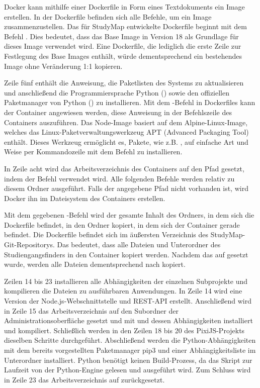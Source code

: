 Docker kann mithilfe einer Dockerfile in Form eines Textdokuments ein Image erstellen. In der Dockerfile befinden sich alle Befehle, um ein Image zusammenzustellen. \parencite{docker_inc_dockerfile_2024} Das für StudyMap entwickelte Dockerfile beginnt mit dem Befehl . Dies bedeutet, dass das Base Image  in Version 18 als Grundlage für dieses Image verwendet wird. Eine Dockerfile, die lediglich die erste Zeile zur Festlegung des Base Images enthält, würde dementsprechend ein bestehendes Image ohne Veränderung 1:1 kopieren. \parencite{the_nodejs_docker_team_node_2024}

Zeile fünf enthält die Anweisung, die Paketlisten des Systems zu aktualisieren und anschließend die Programmiersprache Python () sowie den offiziellen Paketmanager von Python () zu installieren. \parencite{the_pip_developers_pip_2024} Mit dem -Befehl in Dockerfiles kann der Container angewiesen werden, diese Anweisung in der Befehlszeile des Containers auszuführen. Das Node-Image basiert auf dem Alpine-Linux-Image, welches das Linux-Paketverwaltungswerkzeug APT (Advanced Packaging Tool) enthält. \parencite{the_nodejs_docker_team_node_2024} Dieses Werkzeug ermöglicht es, Pakete, wie z.B. , auf einfache Art und Weise per Kommandozeile mit dem Befehl  zu installieren. \parencite{canonical_ltd_ubuntu_package_2024}

In Zeile acht wird das Arbeitsverzeichnis des Containers auf den Pfad  gesetzt, indem der Befehl  verwendet wird. Alle folgenden Befehle werden relativ zu diesem Ordner ausgeführt. Falls der angegebene Pfad nicht vorhanden ist, wird Docker ihn im Dateisystem des Containers erstellen. \parencite{docker_inc_dockerfile_2024}

Mit dem gegebenen -Befehl wird der gesamte Inhalt des Ordners, in dem sich die Dockerfile befindet, in den Ordner kopiert, in dem sich der Container gerade befindet. \parencite{docker_inc_dockerfile_2024} Die Dockerfile befindet sich im äußersten Verzeichnis des StudyMap-Git-Repositorys. Das bedeutet, dass alle Dateien und Unterordner des Studiengangsfinders in den Container kopiert werden. Nachdem das  auf  gesetzt wurde, werden alle Dateien dementsprechend nach  kopiert.

Zeilen 14 bis 23 installieren alle Abhängigkeiten der einzelnen Subprojekte und kompilieren die Dateien zu ausführbaren Anwendungen. In Zeile 14 wird eine Version der Node.js-Webschnittstelle und REST-API erstellt. Anschließend wird in Zeile 15 das Arbeitsverzeichnis auf den Subordner der Administrationsoberfläche gesetzt und mit  und  dessen Abhängigkeiten installiert und kompiliert. Schließlich werden in den Zeilen 18 bis 20 des PixiJS-Projekts dieselben Schritte durchgeführt. Abschließend werden die Python-Abhängigkeiten mit dem bereits vorgestellten Paketmanager pip3 und einer Abhängigkeitsliste im Unterordner  installiert. Python benötigt keinen Build-Prozess, da das Skript zur Laufzeit von der Python-Engine gelesen und ausgeführt wird. Zum Schluss wird in Zeile 23 das Arbeitsverzeichnis auf  zurückgesetzt.

